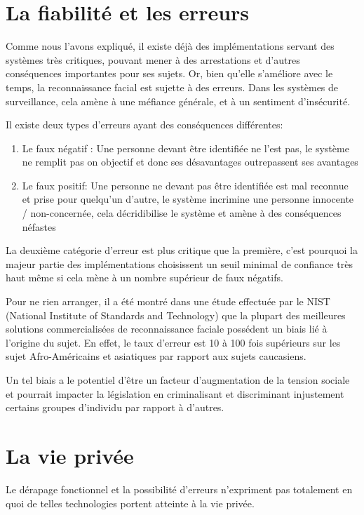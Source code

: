 \section{La fiabilité et les erreurs}
Comme nous l’avons expliqué, il existe déjà des implémentations servant des systèmes très critiques, pouvant
mener à des arrestations et d’autres conséquences importantes pour ses sujets. Or, bien qu’elle s’améliore avec le temps, la reconnaissance facial est sujette à des erreurs. Dans les systèmes de surveillance, cela amène à une
méfiance générale, et à un sentiment d’insécurité. 

Il existe deux types d’erreurs ayant des conséquences différentes:
\begin{enumerate}
\item Le faux négatif : Une personne devant être identifiée ne l’est pas, le système ne remplit pas on objectif et
donc ses désavantages outrepassent ses avantages
\item Le faux positif: Une personne ne devant pas être identifiée est mal reconnue et prise pour quelqu’un
d’autre, le système incrimine une personne innocente / non-concernée, cela décridibilise le système et
amène à des conséquences néfastes
\end{enumerate}

La deuxième catégorie d’erreur est plus critique que la première, c’est pourquoi la majeur partie des
implémentations choisissent un seuil minimal de confiance très haut même si cela mène à un nombre supérieur de
faux négatifs.

Pour ne rien arranger, il a été montré dans une étude effectuée par le NIST (National Institute of Standards and
Technology) que la plupart des meilleures solutions commercialisées de reconnaissance faciale possédent un biais
lié à l’origine du sujet. En effet, le taux d’erreur est 10 à 100 fois supérieurs sur les sujet Afro-Américains et
asiatiques par rapport aux sujets caucasiens.

Un tel biais a le potentiel d’être un facteur d’augmentation de la tension sociale et pourrait impacter la législation
en criminalisant et discriminant injustement certains groupes d’individu par rapport à d’autres.

\section{La vie privée}
Le dérapage fonctionnel et la possibilité d’erreurs n'expriment pas totalement en quoi de telles technologies portent
atteinte à la vie privée.

